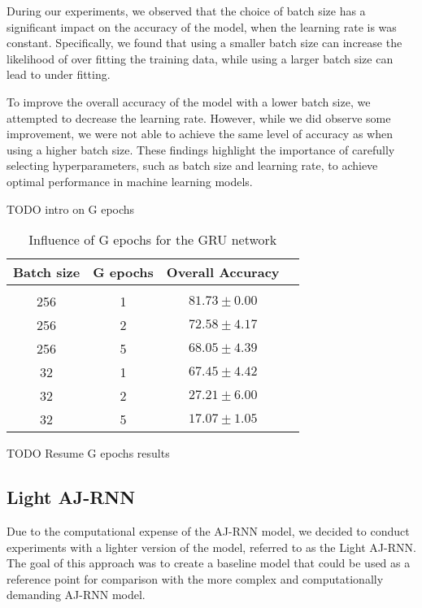 During our experiments, we observed that the choice of batch size has a significant impact on the accuracy of the model, when the learning rate is was constant.
Specifically, we found that using a smaller batch size can increase the likelihood of over fitting the training data, while using a larger batch size can lead to under fitting.

To improve the overall accuracy of the model with a lower batch size, we attempted to decrease the learning rate.
However, while we did observe some improvement, we were not able to achieve the same level of accuracy as when using a higher batch size.
These findings highlight the importance of carefully selecting hyperparameters, such as batch size and learning rate, to achieve optimal performance in machine learning models.


TODO intro on G epochs

\begin{table}[H]
  \centering
  \begin{tabular}{cccr} 
      Batch size & G epochs & Overall Accuracy\\[0.2cm] 
      \hline \\[-0.2cm]
      256 &   1 &  $81.73 \pm 0.00$\\
      256 &   2 &  $72.58 \pm 4.17$\\
      256 &   5 &  $68.05 \pm 4.39$\\
      32  &   1 &  $67.45 \pm 4.42$\\
      32  &   2 &  $27.21 \pm 6.00$\\
      32  &   5 &  $17.07 \pm 1.05$\\
  \end{tabular}
  \caption{Influence of G epochs for the GRU network}
  \label{tab:AJRNNGepochs}
\end{table}

TODO Resume G epochs results


\pagebreak
\subsection{Light AJ-RNN}

Due to the computational expense of the AJ-RNN model, we decided to conduct experiments with a lighter version of the model, referred to as the Light AJ-RNN.
The goal of this approach was to create a baseline model that could be used as a reference point for comparison with the more complex and computationally demanding AJ-RNN model. 


